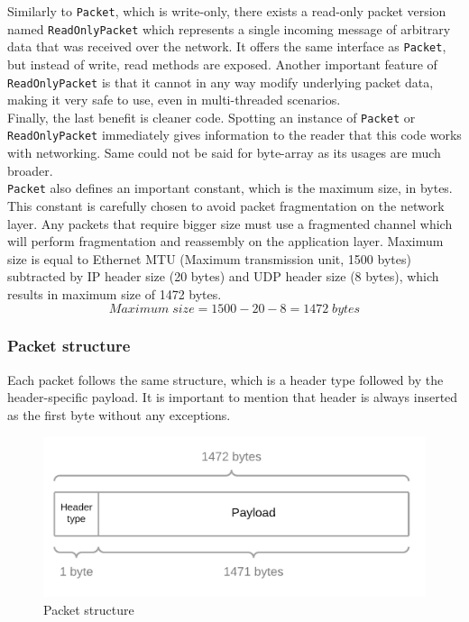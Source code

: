 \documentclass[times, utf8, diplomski]{fer}
\newcommand{\classname}[1]{\texttt{#1}}
\begin{document}
Similarly to \classname{Packet}, which is write-only, there exists a read-only packet version named \classname{Read\-Only\-Packet} which represents a single incoming message of arbitrary data that was received over the network. It offers the same interface as \classname{Packet}, but instead of write, read methods are exposed. Another important feature of \classname{Read\-Only\-Packet} is that it cannot in any way modify underlying packet data, making it very safe to use, even in multi-threaded scenarios. \\

Finally, the last benefit is cleaner code. Spotting an instance of \classname{Packet} or \classname{Read\-Only\-Packet} immediately gives information to the reader that this code works with networking. Same could not be said for byte-array as its usages are much broader. \\

\classname{Packet} also defines an important constant, which is the maximum size, in bytes. This constant is carefully chosen to avoid packet fragmentation on the network layer. Any packets that require bigger size must use a fragmented channel which will perform fragmentation and reassembly on the application layer. Maximum size is equal to Ethernet MTU (Maximum transmission unit, 1500 bytes) subtracted by IP header size (20 bytes) and UDP header size (8 bytes), which results in maximum size of 1472 bytes.\\

\begin{equation}
	Maximum \; size = 1500 - 20 - 8 = 1472 \; bytes \label{eq:max_packet_size}
\end{equation}

\subsubsection{Packet structure}
Each packet follows the same structure, which is a header type followed by the header-specific payload. It is important to mention that header is always inserted as the first byte without any exceptions.

\begin{figure}[h!]
	\centering
	\includegraphics[scale=0.25]{Packet-structure}
	\caption{Packet structure}
\end{figure}
\end{document}
